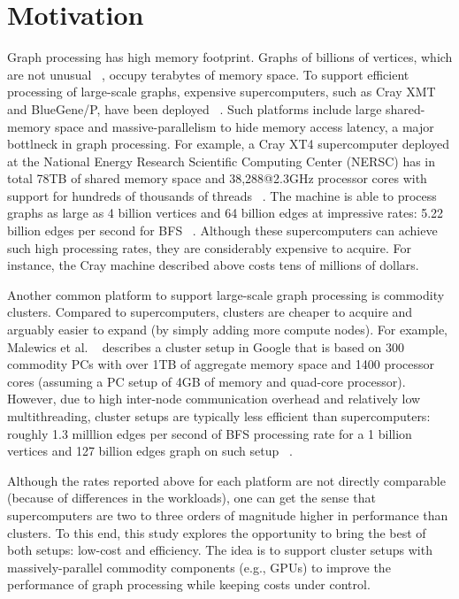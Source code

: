 \section{Motivation}
\label{sec:motivation}

Graph processing has high memory footprint. Graphs of billions of vertices, which are not unusual ~\cite{graph500}, occupy terabytes of memory space. To support efficient processing of large-scale graphs, expensive supercomputers, such as Cray XMT and BlueGene/P, have been deployed ~\cite{mizell2009early, yoo2005scalable}. Such platforms include large shared-memory space and massive-parallelism to hide memory access latency, a major bottlneck in graph processing. For example, a Cray XT4 supercomputer deployed at the National Energy Research Scientific Computing Center (NERSC) has in total 78TB of shared memory space and 38,288@2.3GHz processor cores with support for hundreds of thousands of threads ~\cite{franklin2011cray}. The machine is able to process graphs as large as 4 billion vertices and 64 billion edges at impressive rates: 5.22 billion edges per second for BFS ~\cite{graph500}. Although these supercomputers can achieve such high processing rates, they are considerably expensive to acquire. For instance, the Cray machine described above costs tens of millions of dollars.

Another common platform to support large-scale graph processing is commodity clusters. Compared to supercomputers, clusters are cheaper to acquire and arguably easier to expand (by simply adding more compute nodes). For example, Malewics et al. ~\cite{Malewicz2009} describes a cluster setup in Google that is based on 300 commodity PCs with over 1TB of aggregate memory space and 1400 processor cores (assuming a PC setup of 4GB of memory and quad-core processor). However, due to high inter-node communication overhead and relatively low multithreading, cluster setups are typically less efficient than supercomputers: roughly 1.3 milllion edges per second of BFS processing rate for a 1 billion vertices and 127 billion edges graph on such setup ~\cite{Malewicz2009}.

Although the rates reported above for each platform are not directly comparable (because of differences in the workloads), one can get the sense that supercomputers are two to three orders of magnitude higher in performance than clusters. To this end, this study explores the opportunity to bring the best of both setups: low-cost and efficiency. The idea is to support cluster setups with massively-parallel commodity components (e.g., GPUs) to improve the performance of graph processing while keeping costs under control.

